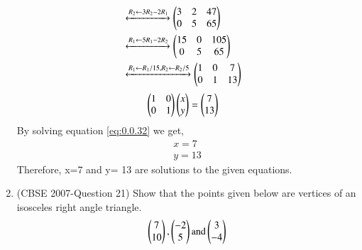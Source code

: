\documentclass[journal,12pt,twocolumn]{IEEEtran}
\begin{document}
\begin{enumerate}
\begin{align}
 \\
&\xleftrightarrow[]{ R_2 \leftarrow 3R_2 - 2R_1}
 \begin{pmatrix}3&2&47\\0&5&65\end{pmatrix}&\\
 &\xleftrightarrow[]{ R_1 \leftarrow 5R_1 - 2R_2}
 \begin{pmatrix}15&0&105\\0&5&65\end{pmatrix}&\\
 &\xleftrightarrow[]{ R_1 \leftarrow R_1/15,R_2\leftarrow R_2/5}
 \begin{pmatrix}1&0&7\\0&1&13\end{pmatrix}&
 \end{align}
 \begin{align}
&\myvec{1&0\\0&1} \myvec{x\\y}= \myvec{7\\13}& \label{eq:0.0.32}
\medskip
\end{align}
By solving equation \eqref{eq:0.0.32} we get,
\begin{align}
&x=7&\\
&y= 13&
\end{align}
Therefore, x=7 and y= 13 are solutions to the given equations. 
\bigskip
\item (CBSE 2007-Question 21) Show that the points given below are vertices of an isosceles right angle triangle.
\begin{align}
\begin{pmatrix}7\\10\end{pmatrix}, \begin{pmatrix}-2\\5\end{pmatrix} \text{and} \begin{pmatrix}3\\-4\end{pmatrix}
\end{align}


\end{enumerate}
\end{document}
